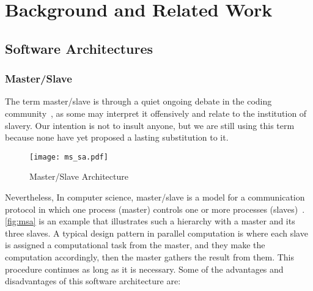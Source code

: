 
\chapter{Background and Related Work}\label{ch:background}\glsresetall




\section{Software Architectures}



\subsection{Master/Slave}
The term master/slave is through a quiet ongoing debate in the coding community~\cite{giz_master, reg_master, med_master}, as some may interpret it offensively and relate to the institution of slavery. Our intention is not to insult anyone, but we are still using this term because none have yet proposed a lasting substitution to it.

\begin{figure}
    \centering
    \texttt{[image: ms\_sa.pdf]}
    \caption{Master/Slave Architecture}
    \label{fig:msa}
\end{figure}

Nevertheless, In computer science, master/slave is a model for a communication protocol in which one process (master) controls one or more processes (slaves)~\cite{ms_bs}. \autoref{fig:msa} is an example that illustrates such a hierarchy with a master and its three slaves. A typical design pattern in parallel computation is where each slave is assigned a computational task from the master, and they make the computation accordingly, then the master gathers the result from them. This procedure continues as long as it is necessary. Some of the advantages and disadvantages of this software architecture are:

